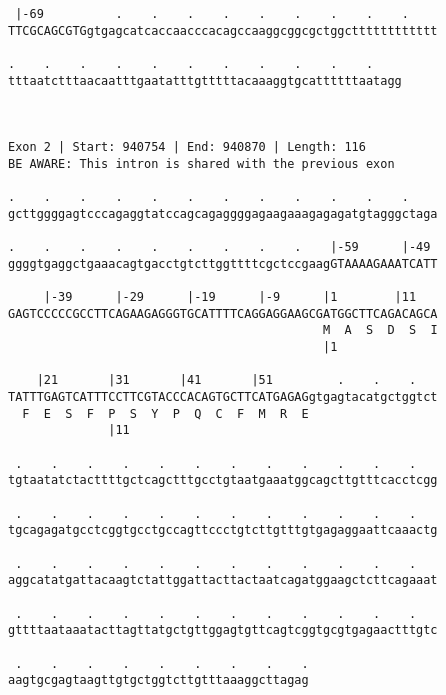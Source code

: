 \documentclass{article}
\begin{document}
\begin{Verbatim}
 |-69          .    .    .    .    .    .    .    .    .    
TTCGCAGCGTGgtgagcatcaccaacccacagccaaggcggcgctggctttttttttttt
                                                            
.    .    .    .    .    .    .    .    .    .    .    
tttaatctttaacaatttgaatatttgtttttacaaaggtgcattttttaatagg
                                                       
                                                       
 
Exon 2 | Start: 940754 | End: 940870 | Length: 116
BE AWARE: This intron is shared with the previous exon
 
.    .    .    .    .    .    .    .    .    .    .    .    
gcttggggagtcccagaggtatccagcagaggggagaagaaagagagatgtagggctaga
                                                            
.    .    .    .    .    .    .    .    .    |-59      |-49 
ggggtgaggctgaaacagtgacctgtcttggttttcgctccgaagGTAAAAGAAATCATT
                                                            
     |-39      |-29      |-19      |-9      |1        |11   
GAGTCCCCCGCCTTCAGAAGAGGGTGCATTTTCAGGAGGAAGCGATGGCTTCAGACAGCA
                                            M  A  S  D  S  I
                                            |1              
  
    |21       |31       |41       |51         .    .    .   
TATTTGAGTCATTTCCTTCGTACCCACAGTGCTTCATGAGAGgtgagtacatgctggtct
  F  E  S  F  P  S  Y  P  Q  C  F  M  R  E                  
              |11                                           
  
 .    .    .    .    .    .    .    .    .    .    .    .   
tgtaatatctacttttgctcagctttgcctgtaatgaaatggcagcttgtttcacctcgg
                                                            
 .    .    .    .    .    .    .    .    .    .    .    .   
tgcagagatgcctcggtgcctgccagttccctgtcttgtttgtgagaggaattcaaactg
                                                            
 .    .    .    .    .    .    .    .    .    .    .    .   
aggcatatgattacaagtctattggattacttactaatcagatggaagctcttcagaaat
                                                            
 .    .    .    .    .    .    .    .    .    .    .    .   
gttttaataaatacttagttatgctgttggagtgttcagtcggtgcgtgagaactttgtc
                                                            
 .    .    .    .    .    .    .    .    .
aagtgcgagtaagttgtgctggtcttgtttaaaggcttagag
                                          

\end{Verbatim}
\end{document}
